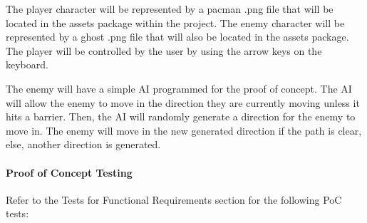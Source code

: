 \documentclass[12pt, titlepage]{article}
\begin{document}
	The player character will be represented by a pacman .png file that will be located in the assets package within the project. The enemy character will be represented by a ghost .png file that will also be located in the assets package. The player will be controlled by the user by using the arrow keys on the keyboard.

	The enemy will have a simple AI programmed for the proof of concept. The AI will allow the enemy to move in the direction they are currently moving unless it hits a barrier. Then, the AI will randomly generate a direction for the enemy to move in. The enemy will move in the new generated direction if the path is clear, else, another direction is generated.
		
\paragraph{Proof of Concept Testing}

Refer to the Tests for Functional Requirements section for the following PoC tests:
\end{document}

